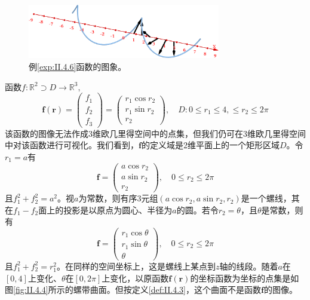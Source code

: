 \documentclass[main.tex]{subfiles}
\begin{document}
\begin{figure}[h]
    \centering
    \includegraphics[width=0.75\textwidth]{images/II.4.3.png}
    \caption{例\ref{exp:II.4.6}函数的图象。}
    \label{fig:II.4.3}
\end{figure}
\begin{example}\label{exp:II.4.7}
    函数$f:\mathbb{R}^2\supset D\rightarrow\mathbb{R}^3,$
    \[
        \mathbf{f}\left(\mathbf{r}\right)=\left(\begin{array}{c}f_1\\f_2\\f_3\end{array}\right)=\left(\begin{array}{c}r_1\cos r_2\\r_1\sin r_2\\r_2\end{array}\right),\quad D: 0\leq r_1\leq 4,\leq r_2\leq 2\pi
    \]
    该函数的图像无法作成3维欧几里得空间中的点集，但我们仍可在3维欧几里得空间中对该函数进行可视化。我们看到，$\mathbf{f}$的定义域是2维平面上的一个矩形区域$D$。令$r_1=a$有
    \[
        \mathbf{f}=\left(\begin{array}{c}
                a\cos r_2 \\
                a\sin r_2 \\
                r_2
            \end{array}\right),\quad 0\leq r_2\leq 2\pi
    \]
    且$f_1^2+f_2^2=a^2$。视$a$为常数，则有序3元组$\left(a\cos r_2,a\sin r_2,r_2\right)$是一个螺线，其在$f_1-f_2$面上的投影是以原点为圆心、半径为$a$的圆。若令$r_2=\theta$，且$\theta$是常数，则有
    \[
        \mathbf{f}=\left(\begin{array}{c}
                r_1\cos \theta \\
                r_1\sin \theta \\
                \theta
            \end{array}\right),\quad 0\leq r_2\leq 2\pi
    \]
    且$f_1^2+f_2^2=r_1^2$。在同样的空间坐标上，这是螺线上某点到$z$轴的线段。随着$a$在$\left[0,4\right]$上变化、$\theta$在$\left[0,2\pi\right]$上变化，以原函数$\mathbf{f}\left(\mathbf{r}\right)$的坐标函数为坐标的点集是如图\ref{fig:II.4.4}所示的螺带曲面。但按定义\ref{def:II.4.3}，这个曲面不是函数$\mathbf{f}$的图像。
\end{example}
\end{document}
